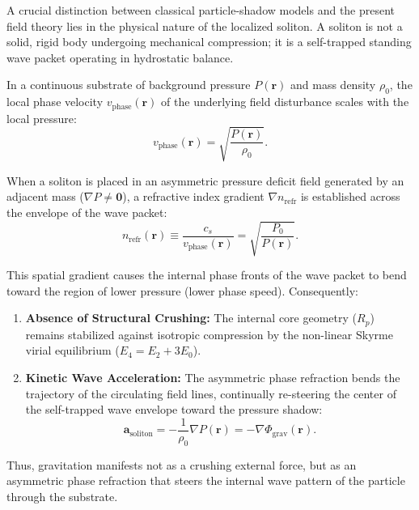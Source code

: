 \documentclass[11pt,a4paper]{article}
\begin{document}
	A crucial distinction between classical particle-shadow models and the present field theory lies in the physical nature of the localized soliton. A soliton is not a solid, rigid body undergoing mechanical compression; it is a self-trapped standing wave packet operating in hydrostatic balance.
	
	In a continuous substrate of background pressure $P(\mathbf{r})$ and mass density $\rho_0$, the local phase velocity $v_{\text{phase}}(\mathbf{r})$ of the underlying field disturbance scales with the local pressure:
	\begin{equation}
		v_{\text{phase}}(\mathbf{r}) = \sqrt{\frac{P(\mathbf{r})}{\rho_0}}.
		\label{eq:phase_velocity_pressure}
	\end{equation}
	
	When a soliton is placed in an asymmetric pressure deficit field generated by an adjacent mass ($\nabla P \neq \mathbf{0}$), a refractive index gradient $\nabla n_{\text{refr}}$ is established across the envelope of the wave packet:
	\begin{equation}
		n_{\text{refr}}(\mathbf{r}) \equiv \frac{c_s}{v_{\text{phase}}(\mathbf{r})} = \sqrt{\frac{P_0}{P(\mathbf{r})}}.
		\label{eq:refractive_index_def}
	\end{equation}
	
	This spatial gradient causes the internal phase fronts of the wave packet to bend toward the region of lower pressure (lower phase speed). Consequently:
	\begin{enumerate}
		\item \textbf{Absence of Structural Crushing:} The internal core geometry ($R_p$) remains stabilized against isotropic compression by the non-linear Skyrme virial equilibrium ($E_4 = E_2 + 3E_0$).
		\item \textbf{Kinetic Wave Acceleration:} The asymmetric phase refraction bends the trajectory of the circulating field lines, continually re-steering the center of the self-trapped wave envelope toward the pressure shadow:
		\begin{equation}
			\mathbf{a}_{\text{soliton}} = -\frac{1}{\rho_0} \nabla P(\mathbf{r}) = -\nabla \Phi_{\text{grav}}(\mathbf{r}).
			\label{eq:wave_acceleration_derived}
		\end{equation}
	\end{enumerate}
	Thus, gravitation manifests not as a crushing external force, but as an asymmetric phase refraction that steers the internal wave pattern of the particle through the substrate.
	
\end{document}
